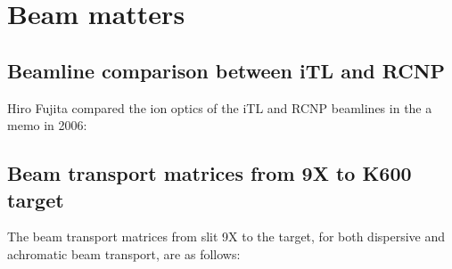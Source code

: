 \documentclass[11pt]{report}
\begin{document}
\clearpage


\chapter{Beam matters}

\section{Beamline comparison between iTL and RCNP}

Hiro Fujita compared the ion optics of the iTL and RCNP beamlines in the
a memo in 2006:

\begin{figure}[!ht]
\centerline{\vspace{-3cm}\hspace{0cm}
}
\centering
\end{figure} 

\begin{figure}[!ht]
\centerline{\vspace{0cm}\hspace{0cm}
}
\centering
\end{figure} 

\begin{figure}[!ht]
\centerline{\vspace{0cm}\hspace{0cm}
}
\centering
\end{figure} 

\clearpage


\section{Beam transport matrices from 9X to K600 target}

The beam transport matrices from slit 9X to the target, for both 
dispersive and achromatic beam transport, are as follows:
\end{document}
